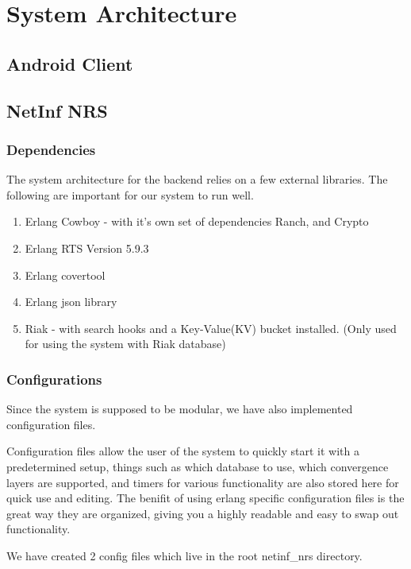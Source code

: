 \documentclass[11pt]{report}
\begin{document}
\chapter{System Architecture}

\section {Android Client}

\section {NetInf NRS}

\subsection {Dependencies}

The system architecture for the backend relies on a few external libraries. The following are important for our system to run well. 

\begin {enumerate}
\item Erlang Cowboy - with it's own set of dependencies Ranch, and Crypto
\item Erlang RTS Version 5.9.3
\item Erlang covertool
\item Erlang json library
\item Riak - with search hooks and a Key-Value(KV) bucket installed.
		(Only used for using the system with Riak database)
\end {enumerate}

\subsection {Configurations}

Since the system is supposed to be modular, we have also implemented configuration files. 

Configuration files allow the user of the system to quickly start it with a predetermined setup, things such as which database to use, which convergence layers are supported, and timers for various functionality are also stored here for quick use and editing. The benifit of using erlang specific configuration files is the great way they are organized, giving you a highly readable and easy to swap out functionality. 

We have created 2 config files which live in the root netinf\_nrs directory.
\end{document}
